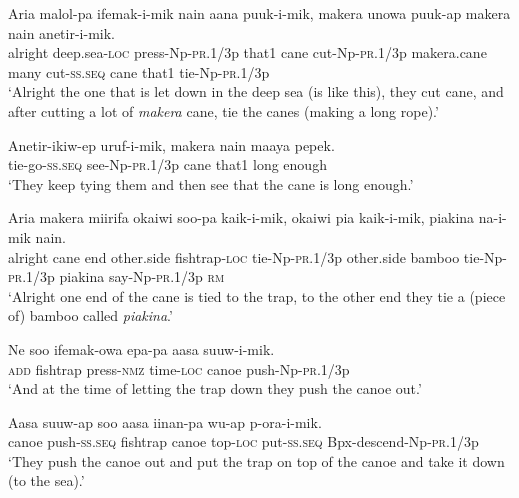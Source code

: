 {\ea\label{ex:a:x12}
\gll  Aria  malol-pa  ifemak-i-mik  nain  aana        puuk-i-mik,  makera  unowa  puuk-ap             makera  nain  anetir-i-mik. \\
alright  deep.sea-\textsc{loc}  press-Np-\textsc{pr}.1/3p  that1  cane  cut-Np-\textsc{pr}.1/3p  makera.cane  many  cut-\textsc{ss.seq}   cane  that1  tie-Np-\textsc{pr}.1/3p \\




\glt ‘Alright the one that is let down in the deep sea (is like this), they cut cane, and after cutting a lot of \textit{makera} cane, tie the canes (making a long rope).’ \\
\z


\ea\label{ex:a:x13}
\gll  Anetir-ikiw-ep  uruf-i-mik,  makera  nain  maaya  pepek. \\
tie-go-\textsc{ss.seq}  see-Np-\textsc{pr}.1/3p  cane  that1  long  enough \\
\glt ‘They keep tying them and then see that the cane is long enough.’ \\
\z


\ea\label{ex:a:x14}
\gll  Aria  makera  miirifa  okaiwi  soo-pa  kaik-i-mik,       okaiwi  pia  kaik-i-mik,  piakina  na-i-mik  nain. \\
alright  cane  end  other.side  fishtrap-\textsc{loc}  tie-Np-\textsc{pr}.1/3p   other.side  bamboo  tie{}-Np-\textsc{pr}.1/3p  piakina  say-Np-\textsc{pr}.1/3p  \textsc{rm} \\


\glt ‘Alright one end of the cane is tied to the trap, to the other end they tie a (piece of) bamboo called \textit{piakina}.’ \\
\z


\ea\label{ex:a:x15}
\gll  Ne  soo  ifemak-owa  epa-pa  aasa  suuw-i-mik. \\
\textsc{add}  fishtrap  press-\textsc{nmz}  time-\textsc{loc}  canoe  push{}-Np-\textsc{pr}.1/3p \\
\glt ‘And at the time of letting the trap down they push the canoe out.’ \\
\z


\ea\label{ex:a:x16}
\gll  Aasa  suuw-ap  soo  aasa  iinan-pa  wu-ap           p-ora-i-mik. \\
canoe  push-\textsc{ss.seq}  fishtrap  canoe  top-\textsc{loc}  put-\textsc{ss.seq}  Bpx-descend-Np-\textsc{pr}.1/3p \\


\glt ‘They push the canoe out and put the trap on top of the canoe and take it down (to the sea).’ \\
\z


}
